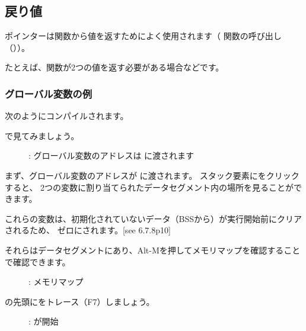 \subsection{戻り値}

ポインターは関数から値を返すためによく使用されます（ \scanf 関数の呼び出し（））。 

たとえば、関数が2つの値を返す必要がある場合などです。

\subsubsection{グローバル変数の例}



次のようにコンパイルされます。



\myindex{\olly}
\clearpage
\olly で見てみましょう。

\begin{figure}[H]
\centering
{}
\caption{\olly: 
グローバル変数のアドレスは \ttfone に渡されます}
\label{fig:pointers_olly_global_1}
\end{figure}

まず、グローバル変数のアドレスが \ttfone に渡されます。
スタック要素にをクリックすると、
2つの変数に割り当てられたデータセグメント内の場所を見ることができます。

\clearpage
これらの変数は、初期化されていないデータ（\ac{BSS}から）が実行開始前にクリアされるため、
ゼロにされます。[see \CNineNineStd{} 6.7.8p10]

それらはデータセグメントにあり、Alt-Mを押してメモリマップを確認することで確認できます。

\begin{figure}[H]
\centering
{}
\caption{\olly: メモリマップ}
\label{fig:pointers_olly_global_5}
\end{figure}

\clearpage
\ttfone の先頭にをトレース（F7）しましょう。

\begin{figure}[H]
\centering
{}
\caption{\olly: \ttfone が開始}
\label{fig:pointers_olly_global_2}
\end{figure}

